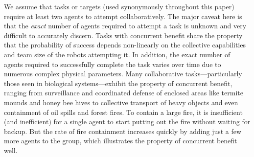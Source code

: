 \documentclass[12pt]{book}
\begin{document}
We assume that tasks or targets (used synonymously throughout this paper) require at least two agents to attempt collaboratively. The major caveat here is that the \emph{exact} number of agents required to attempt a task is unknown and very difficult to accurately discern. Tasks with concurrent benefit share the property that the probability of success depends non-linearly on the collective capabilities and team size of the robots attempting it. In addition, the exact number of agents required to successfully complete the task varies over time due to numerous  complex physical parameters. Many collaborative tasks---particularly those seen in biological systems---exhibit the property of concurrent benefit, ranging from surveillance and coordinated defense of enclosed areas like termite mounds and honey bee hives \cite{Breed1990} to collective transport of heavy objects and even containment of oil spills and forest fires. To contain a large fire, it is insufficient (and inefficient) for a single agent to start putting out the fire without waiting for backup. But the rate of fire containment increases quickly by adding just a few more agents to the group, which illustrates the property of concurrent benefit well.
\end{document}
